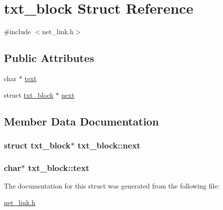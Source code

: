 \hypertarget{structtxt__block}{\section{txt\-\_\-block Struct Reference}
\label{structtxt__block}
}


{\ttfamily \#include $<$net\-\_\-link.\-h$>$}

\subsection*{Public Attributes}
\begin{DoxyCompactItemize}
\item 
char $\ast$ \hyperlink{structtxt__block_aa7d2797d5b5246c11007992ece6adc65}{text}
\item 
struct \hyperlink{structtxt__block}{txt\-\_\-block} $\ast$ \hyperlink{structtxt__block_a38c848381c56d510c724f83ea4909b5f}{next}
\end{DoxyCompactItemize}


\subsection{Member Data Documentation}
\hypertarget{structtxt__block_a38c848381c56d510c724f83ea4909b5f}{
\subsubsection[{next}]{\setlength{\rightskip}{0pt plus 5cm}struct {\bf txt\-\_\-block}$\ast$ txt\-\_\-block\-::next}}\label{structtxt__block_a38c848381c56d510c724f83ea4909b5f}
\hypertarget{structtxt__block_aa7d2797d5b5246c11007992ece6adc65}{
\subsubsection[{text}]{\setlength{\rightskip}{0pt plus 5cm}char$\ast$ txt\-\_\-block\-::text}}\label{structtxt__block_aa7d2797d5b5246c11007992ece6adc65}


The documentation for this struct was generated from the following file\-:\begin{DoxyCompactItemize}
\item 
\hyperlink{net__link_8h}{net\-\_\-link.\-h}\end{DoxyCompactItemize}
